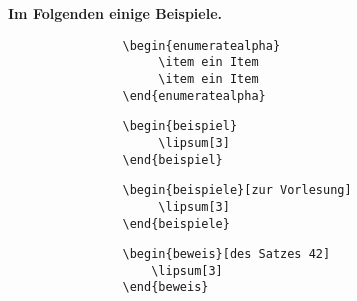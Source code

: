 			\noindent \textbf{Im Folgenden einige Beispiele.}
			
			\begin{verbatim}
				\begin{enumeratealpha} 
				     \item ein Item 
				     \item ein Item 
				\end{enumeratealpha}
			\end{verbatim}
			
			
			\newpage
			
			\begin{verbatim}
				\begin{beispiel} 
				     \lipsum[3] 
				\end{beispiel}
			\end{verbatim}
			
			
			\begin{verbatim}
				\begin{beispiele}[zur Vorlesung] 
				     \lipsum[3] 
				\end{beispiele}
			\end{verbatim}
			
			
			\begin{verbatim}
				\begin{beweis}[des Satzes 42] 
				    \lipsum[3] 
				\end{beweis}
			\end{verbatim}
					
